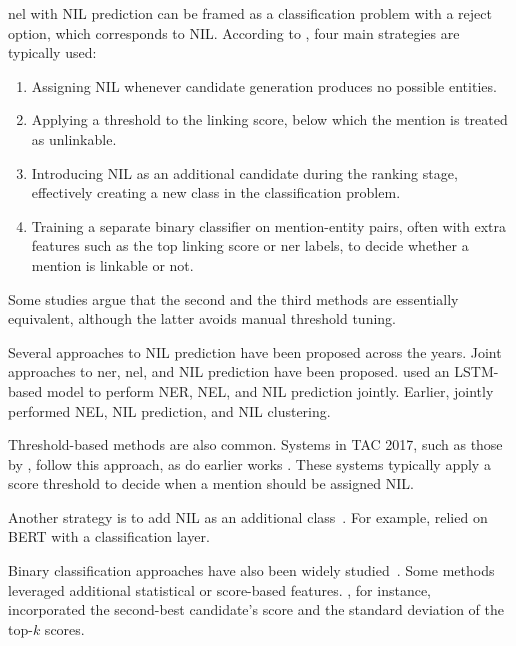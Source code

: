 
\ac{nel} with NIL prediction can be framed as a classification problem with a reject option, which corresponds to NIL. According to \textcite{Sevgili2022NeuralEL}, four main strategies are typically used:
\begin{enumerate}
\item Assigning NIL whenever candidate generation produces no possible entities.
\item Applying a threshold to the linking score, below which the mention is treated as unlinkable.
\item Introducing NIL as an additional candidate during the ranking stage, effectively creating a new class in the classification problem.
\item Training a separate binary classifier on mention-entity pairs, often with extra features such as the top linking score or \ac{ner} labels, to decide whether a mention is linkable or not.
\end{enumerate}

Some studies \cite{Zhang2012TheNE, Rao2013EntityLF} argue that the second and the third methods are essentially equivalent, although the latter avoids manual threshold tuning.

Several approaches to NIL prediction have been proposed across the years.
Joint approaches to \ac{ner}, \ac{nel}, and NIL prediction have been proposed. \textcite{martins-etal-2019-joint} used an LSTM-based model to perform NER, NEL, and NIL prediction jointly. Earlier, \textcite{Fahrni2012HITSMA,Fahrni2013hits} jointly performed NEL, NIL prediction, and NIL clustering.

Threshold-based methods are also common. Systems in TAC 2017, such as those by \cite{BernierColborne2017CRIMsSF,Jiang2017SRCBED}, follow this approach, as do earlier works \cite{tan2015buptteam,Byrne2013UCDIA,huang2013msr,dalton2013umass}. These systems typically apply a score threshold to decide when a mention should be assigned NIL.

Another strategy is to add NIL as an additional class~\cite{Broscheit_2019,Rao2013EntityLF,Li2017AHM,klang2019overview,chen2013casia,barrena2013ubc,zhang2012nlprir,mcnamee2011cross}. For example, \textcite{Broscheit_2019} relied on BERT with a classification layer.

Binary classification approaches have also been widely studied~\cite{moreno_combining_word_entity_embeddings_2017,Yang2017TheTS,yang2013buptteam,Pink2013SYDNEYCA,zhou2013description,monahan2012lorify}. Some methods leveraged additional statistical or score-based features. \textcite{Yang2017TheTS}, for instance, incorporated the second-best candidate’s score and the standard deviation of the top-$k$ scores.

